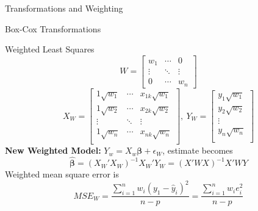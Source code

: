 \documentclass{article}
\begin{document}
\begin{multicols*}{3}
\begin{blackbox}{Transformations and Weighting}
\begin{bluebox}{Box-Cox Transformations}
    \end{bluebox}
    \renewcommand{\arraystretch}{0.75}
    \begin{pinkbox}{Weighted Least Squares}
        \[W = \begin{bmatrix}
            w_1 & \cdots & 0 \\
            \vdots & \ddots  & \vdots\\
            0  & \cdots & w_n
        \end{bmatrix}\]
        \[X_W = \begin{bmatrix}
            1\sqrt{w_1} & \cdots & x_{1k}\sqrt{w_1}\\
            1\sqrt{w_2} & \cdots & x_{2k}\sqrt{w_2}\\
            \vdots  & \ddots & \vdots\\
            1\sqrt{w_n}  & \cdots & x_{nk}\sqrt{w_n}\\
        \end{bmatrix}, \ Y_W = \begin{bmatrix}
            y_1\sqrt{w_1}\\
            y_2\sqrt{w_2}\\
            \vdots\\
            y_n\sqrt{w_n}\\
        \end{bmatrix}\]
        \textbf{New Weighted Model:} $Y_w = X_w\boldsymbol{\beta} + \epsilon_W$, estimate becomes\\[-2ex] 
        \[\boldsymbol{\hat{\beta}} = (X_W'X_W)^{-1}X_W'Y_W = (X'WX)^{-1}X'WY\]
        Weighted mean square error is\\[-2ex]
        \[MSE_W = \frac{\sum_{i=1}^n w_i(y_1 - \hat{y}_i)^2}{n-p} = \frac{\sum_{i=1}^nw_ie_i^2}{n-p}\]
    \end{pinkbox}\\[-2ex]
    \end{blackbox}
\end{multicols*}
\end{document}
